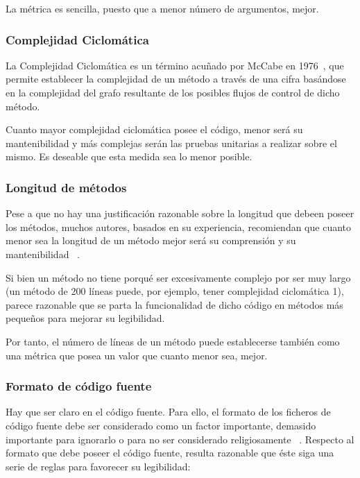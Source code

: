 \documentclass[11pt]{article}
\begin{document}
La métrica es sencilla, puesto que a menor número de argumentos, mejor.

\subsubsection{Complejidad Ciclomática}

La Complejidad Ciclomática es un término acuñado por McCabe en 1976~\cite{mccabe:acomplexitymeasure}, que permite establecer la complejidad de un método a través de una cifra basándose en la complejidad del grafo resultante de los posibles flujos de control de dicho método.

Cuanto mayor complejidad ciclomática posee el código, menor será su mantenibilidad y más complejas serán las pruebas unitarias a realizar sobre el mismo. Es deseable que esta medida sea lo menor posible.

\subsubsection{Longitud de métodos}

Pese a que no hay una justificación razonable sobre la longitud que debeen poseer los métodos, muchos autores, basados en su experiencia, recomiendan que cuanto menor sea la longitud de un método mejor será su comprensión y su mantenibilidad ~\cite{unclebob:cleancode}.

Si bien un método no tiene porqué ser excesivamente complejo por ser muy largo (un método de 200 líneas puede, por ejemplo, tener complejidad ciclomática 1), parece razonable que se parta la funcionalidad de dicho código en métodos más pequeños para mejorar su legibilidad. 

Por tanto, el número de líneas de un método puede establecerse también como una métrica que posea un valor que cuanto menor sea, mejor.

\subsubsection{Formato de código fuente}

Hay que ser claro en el código fuente. Para ello, el formato de los ficheros de código fuente debe ser considerado como un factor importante, demasido importante para ignorarlo o para no ser considerado religiosamente ~\cite{unclebob:cleancode}.
Respecto al formato que debe poseer el código fuente, resulta razonable que éste siga una serie de reglas para favorecer su legibilidad:
\end{document}
